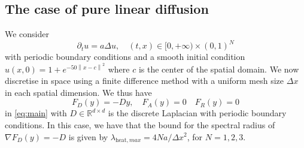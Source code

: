 \documentclass[10pt,a4paper]{article}
\newcommand{\norm}[1]{\left\lVert #1 \right\rVert}
\begin{document}
\subsection{The case of pure linear diffusion}
We  consider 
\begin{equation}\label{eq:heat}
\partial_t u=a\Delta u, \quad (t,x)\in[0,+\infty)\times(0,1)^{N}
\end{equation}
with periodic boundary conditions and a smooth initial condition $u(x,0)=1+e^{-50\norm{x-c}^2}$ where $c$ is the center of the spatial domain.  We  now  discretise in space using a finite difference method with a uniform mesh size $\Delta x$ in each spatial dimension.  We thus have 
\begin{equation} \label{eq:pure_diffusion}
F_{D}(y)= -Dy, \quad F_{A}(y)=0 \quad F_{R}(y)=0
\end{equation}
in \eqref{eq:main} with  $D \in \mathbb{R}^{d\times d}$ is the discrete Laplacian with periodic boundary conditions. In this case, we have that the bound for the spectral radius of $\nabla F_{D}(y)=-D$ is given by $\lambda_{\text{heat},max}=4 N a /\Delta x^{2}$, for $N=1,2,3$.
\end{document}
